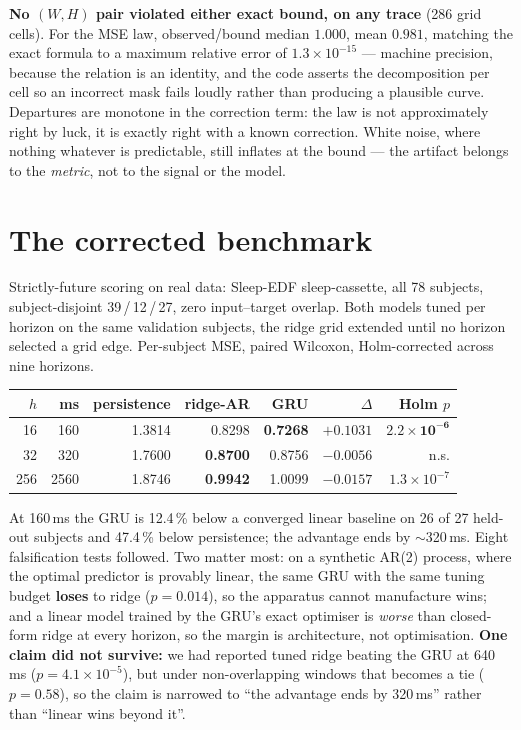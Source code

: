 \documentclass[10pt]{article}
\begin{document}
\vspace{1pt}
\noindent\textbf{No $(W,H)$ pair violated either exact bound, on any trace}
(286 grid cells). For the MSE law, observed/bound median $1.000$, mean $0.981$,
matching the exact formula to a maximum relative error of $1.3\times10^{-15}$ ---
machine precision, because the relation is an identity, and the code asserts the
decomposition per cell so an incorrect mask fails loudly rather than producing a
plausible curve. Departures are monotone in the correction term: the law is not
approximately right by luck, it is exactly right with a known correction. White
noise, where nothing whatever is predictable, still inflates at the bound --- the
artifact belongs to the \emph{metric}, not to the signal or the model.

\section{The corrected benchmark}

Strictly-future scoring on real data: Sleep-EDF sleep-cassette, all 78 subjects,
subject-disjoint 39\,/\,12\,/\,27, zero input--target overlap. Both models tuned per
horizon on the same validation subjects, the ridge grid extended until no horizon
selected a grid edge. Per-subject MSE, paired Wilcoxon, Holm-corrected across nine
horizons.

\begin{center}\small
\begin{tabular}{rrrrrrr}
\toprule
$h$ & ms & persistence & ridge-AR & GRU & $\Delta$ & Holm $p$ \\
\midrule
16 & 160 & 1.3814 & 0.8298 & \textbf{0.7268} & $\mathbf{+0.1031}$ & $\mathbf{2.2\times10^{-6}}$ \\
32 & 320 & 1.7600 & \textbf{0.8700} & 0.8756 & $-0.0056$ & n.s. \\
256 & 2560 & 1.8746 & \textbf{0.9942} & 1.0099 & $-0.0157$ & $1.3\times10^{-7}$ \\
\bottomrule
\end{tabular}
\end{center}

At 160\,ms the GRU is 12.4\,\% below a converged linear baseline on 26 of 27
held-out subjects and 47.4\,\% below persistence; the advantage ends by
$\sim$320\,ms. Eight falsification tests followed. Two matter most: on a synthetic
AR(2) process, where the optimal predictor is provably linear, the same GRU with
the same tuning budget \textbf{loses} to ridge ($p{=}0.014$), so the apparatus
cannot manufacture wins; and a linear model trained by the GRU's exact optimiser
is \emph{worse} than closed-form ridge at every horizon, so the margin is
architecture, not optimisation. \textbf{One claim did not survive:} we had reported
tuned ridge beating the GRU at 640\,ms ($p{=}4.1\times10^{-5}$), but under
non-overlapping windows that becomes a tie ($p{=}0.58$), so the claim is narrowed
to ``the advantage ends by 320\,ms'' rather than ``linear wins beyond it''.
\end{document}
